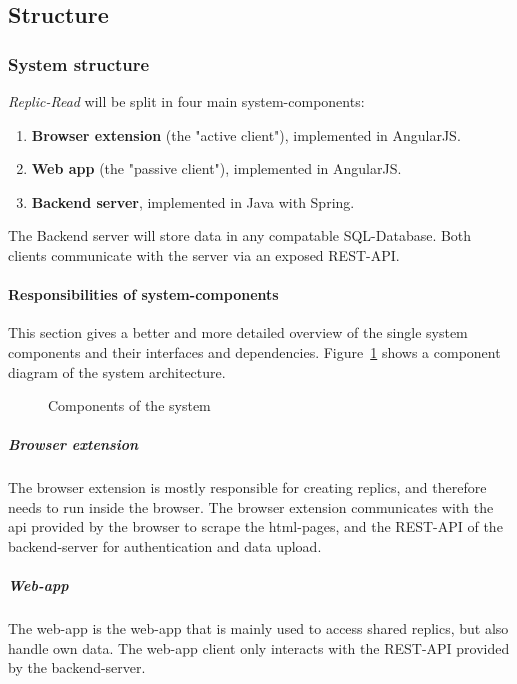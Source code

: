 \subsection{Structure}\label{subsec:structure}

\subsubsection{System structure}
\textit{Replic-Read} will be split in four main system-components:
\begin{enumerate}
    \item \textbf{Browser extension} (the "active client"), implemented in AngularJS\@.
    \item \textbf{Web app} (the "passive client"), implemented in AngularJS\@.
    \item \textbf{Backend server}, implemented in Java with Spring.
\end{enumerate}

The Backend server will store data in any compatable SQL-Database.
Both clients communicate with the server via an exposed REST-API\@.

\paragraph{Responsibilities of system-components}
This section gives a better and more detailed overview of the single system components and their interfaces and dependencies.
Figure~\ref{fig:component-system} shows a component diagram of the system architecture.

\begin{figure}
    \centering

    \caption{Components of the system}
    \label{fig:component-system}
\end{figure}

\subparagraph{Browser extension}
The browser extension is mostly responsible for creating replics, and therefore needs to run inside the browser.
The browser extension communicates with the api provided by the browser to scrape the html-pages, and the REST-API of the backend-server for authentication and data upload.

\subparagraph{Web-app}
The web-app is the web-app that is mainly used to access shared replics, but also handle own data.
The web-app client only interacts with the REST-API provided by the backend-server.

